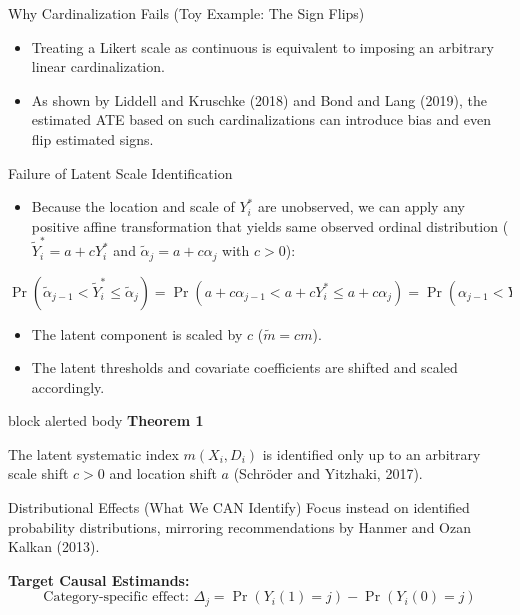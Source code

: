 \documentclass[final]{beamer}
\newlength{\colwidth}
\newcommand{\assumptionbox}[2]{%
\begin{beamercolorbox}[rounded=true,shadow=false,sep=0.6em,wd=\linewidth]{block alerted body}
\textbf{#1}\par\smallskip #2
\end{beamercolorbox}}
\begin{document}
\begin{frame}[t]
\begin{columns}[t,totalwidth=0.995\paperwidth]
\begin{column}{\colwidth}
\begin{block}{Why Cardinalization Fails (Toy Example: The Sign Flips)}
\begin{itemize}\setlength\itemsep{0.25em}
  \item Treating a Likert scale as continuous is equivalent to imposing an arbitrary linear cardinalization.
  \item As shown by Liddell and Kruschke (2018) and Bond and Lang (2019), the estimated ATE based on such cardinalizations can introduce bias and even flip estimated signs. 
\end{itemize}
\end{block}

\vspace{-0.5cm}

\begin{block}{Failure of Latent Scale Identification}
\justifying
\begin{itemize}
  \item Because the location and scale of $Y_i^*$ are unobserved, we can apply any positive affine transformation that yields same observed ordinal distribution ($\tilde{Y}_i^* = a + c Y_i^*$ and $\tilde{\alpha}_j = a + c \alpha_j$ with $c > 0$):
\end{itemize}

  \vspace{-0.7cm}

\[
\Pr(\tilde{\alpha}_{j-1} < \tilde{Y}_i^* \le \tilde{\alpha}_j) 
= \Pr(a + c\alpha_{j-1} < a + cY_i^* \le a + c\alpha_j) 
= \Pr(\alpha_{j-1} < Y_i^* \le \alpha_j).
\]

\begin{itemize}\setlength\itemsep{0.25em}
  \item The latent component is scaled by $c$ ($\tilde{m} = c m$).
  \item The latent thresholds and covariate coefficients are shifted and scaled accordingly.
\end{itemize}

\vspace{0.4em}
\assumptionbox{Theorem 1}{
The latent systematic index $m(X_i, D_i)$ is identified only up to an arbitrary scale shift $c > 0$ and location shift $a$ (Schröder and Yitzhaki, 2017).}
\end{block}

\begin{block}{Distributional Effects (What We CAN Identify)}
Focus instead on identified probability distributions, mirroring recommendations by Hanmer and Ozan Kalkan (2013).

\vspace{0.3em}
\textbf{Target Causal Estimands:}
\[
\text{Category-specific effect: } \Delta_j = \Pr(Y_i(1) = j) - \Pr(Y_i(0) = j)
\]


\end{block}
\end{column}
\end{columns}
\end{frame}
\end{document}
